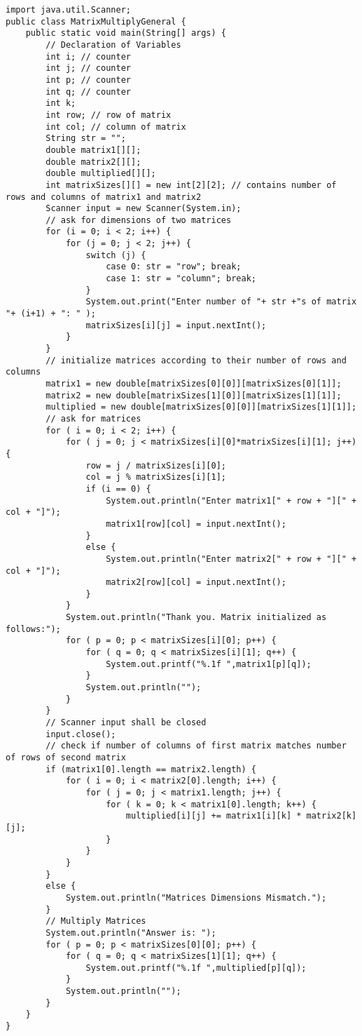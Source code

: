 \documentclass[12pt,letterpaper,twoside]{article}
\begin{document}
\lstset{language=Java,tabsize=2}
\begin{lstlisting}
import java.util.Scanner;
public class MatrixMultiplyGeneral {
	public static void main(String[] args) {
		// Declaration of Variables
		int i; // counter
		int j; // counter
		int p; // counter
		int q; // counter
		int k;
		int row; // row of matrix
		int col; // column of matrix
		String str = "";
		double matrix1[][];
		double matrix2[][];
		double multiplied[][];
		int matrixSizes[][] = new int[2][2]; // contains number of rows and columns of matrix1 and matrix2
		Scanner input = new Scanner(System.in);
		// ask for dimensions of two matrices
		for (i = 0; i < 2; i++) {
			for (j = 0; j < 2; j++) {
				switch (j) {
					case 0: str = "row"; break;
					case 1: str = "column"; break;
				}
				System.out.print("Enter number of "+ str +"s of matrix "+ (i+1) + ": " );
				matrixSizes[i][j] = input.nextInt();
			}
		}
		// initialize matrices according to their number of rows and columns
		matrix1 = new double[matrixSizes[0][0]][matrixSizes[0][1]];
		matrix2 = new double[matrixSizes[1][0]][matrixSizes[1][1]];
		multiplied = new double[matrixSizes[0][0]][matrixSizes[1][1]];
		// ask for matrices
		for ( i = 0; i < 2; i++) {
			for ( j = 0; j < matrixSizes[i][0]*matrixSizes[i][1]; j++) {
				row = j / matrixSizes[i][0];
				col = j % matrixSizes[i][1];
				if (i == 0) {
					System.out.println("Enter matrix1[" + row + "][" + col + "]");
					matrix1[row][col] = input.nextInt();
				}
				else {
					System.out.println("Enter matrix2[" + row + "][" + col + "]");
					matrix2[row][col] = input.nextInt();
				}
			}
			System.out.println("Thank you. Matrix initialized as follows:");
			for ( p = 0; p < matrixSizes[i][0]; p++) {
				for ( q = 0; q < matrixSizes[i][1]; q++) {
					System.out.printf("%.1f ",matrix1[p][q]);
				}
				System.out.println("");
			}
		}
		// Scanner input shall be closed
		input.close();
		// check if number of columns of first matrix matches number of rows of second matrix
		if (matrix1[0].length == matrix2.length) {
			for ( i = 0; i < matrix2[0].length; i++) {
				for ( j = 0; j < matrix1.length; j++) {
					for ( k = 0; k < matrix1[0].length; k++) {
						multiplied[i][j] += matrix1[i][k] * matrix2[k][j];
					}
				}
			}
		}
		else {
			System.out.println("Matrices Dimensions Mismatch.");
		}
		// Multiply Matrices
		System.out.println("Answer is: ");
		for ( p = 0; p < matrixSizes[0][0]; p++) {
			for ( q = 0; q < matrixSizes[1][1]; q++) {
				System.out.printf("%.1f ",multiplied[p][q]);
			}
			System.out.println("");
		}
	}
}
\end{lstlisting}
\end{document}
